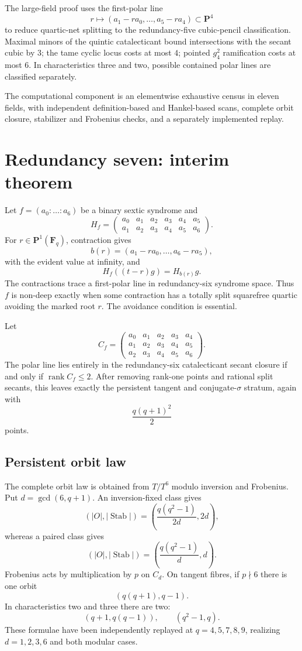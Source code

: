 \documentclass[11pt]{article}
\newcommand{\F}{\mathbf F}
\newcommand{\Stab}{\operatorname{Stab}}
\newcommand{\rank}{\operatorname{rank}}
\begin{document}
The large-field proof uses the first-polar line
\[
 r\longmapsto(a_1-ra_0,\ldots,a_5-ra_4)\subset\mathbf P^4
\]
to reduce quartic-net splitting to the redundancy-five cubic-pencil
classification.  Maximal minors of the quintic catalecticant bound
intersections with the secant cubic by $3$; the tame cyclic locus costs
at most $4$; pointed $g^2_4$ ramification costs at most $6$.  In
characteristics three and two, possible contained polar lines are
classified separately.

The computational component is an elementwise exhaustive census in
eleven fields, with independent definition-based and Hankel-based scans,
complete orbit closure, stabilizer and Frobenius checks, and a separately
implemented replay.

\section{Redundancy seven: interim theorem}

Let $f=(a_0:\ldots:a_6)$ be a binary sextic syndrome and
\[
 H_f=
 \begin{pmatrix}
 a_0&a_1&a_2&a_3&a_4&a_5\\
 a_1&a_2&a_3&a_4&a_5&a_6
 \end{pmatrix}.
\]
For $r\in\mathbf P^1(\F_q)$, contraction gives
\[
 b(r)=(a_1-ra_0,\ldots,a_6-ra_5),
\]
with the evident value at infinity, and
\[
 H_f((t-r)g)=H_{b(r)}g.
\]
The contractions trace a first-polar line in redundancy-six syndrome
space.  Thus $f$ is non-deep exactly when some contraction has a totally
split squarefree quartic avoiding the marked root $r$.  The avoidance
condition is essential.

Let
\[
 C_f=
 \begin{pmatrix}
 a_0&a_1&a_2&a_3&a_4\\
 a_1&a_2&a_3&a_4&a_5\\
 a_2&a_3&a_4&a_5&a_6
 \end{pmatrix}.
\]
The polar line lies entirely in the redundancy-six catalecticant secant
closure if and only if $\rank C_f\leq2$.  After removing rank-one points
and rational split secants, this leaves exactly the persistent tangent
and conjugate-$\sigma$ stratum, again with
\[
 \frac{q(q+1)^2}{2}
\]
points.

\subsection{Persistent orbit law}

The complete orbit law is obtained from $T/T^6$ modulo inversion and
Frobenius.  Put $d=\gcd(6,q+1)$.  An inversion-fixed class gives
\[
 (|O|,|\Stab|)
 =
 \left(\frac{q(q^2-1)}{2d},2d\right),
\]
whereas a paired class gives
\[
 (|O|,|\Stab|)
 =
 \left(\frac{q(q^2-1)}d,d\right).
\]
Frobenius acts by multiplication by $p$ on $C_d$.  On tangent fibres,
if $p\nmid6$ there is one orbit
\[
 (q(q+1),q-1).
\]
In characteristics two and three there are two:
\[
 (q+1,q(q-1)),\qquad(q^2-1,q).
\]
These formulae have been independently replayed at
$q=4,5,7,8,9$, realizing $d=1,2,3,6$ and both modular cases.
\end{document}
